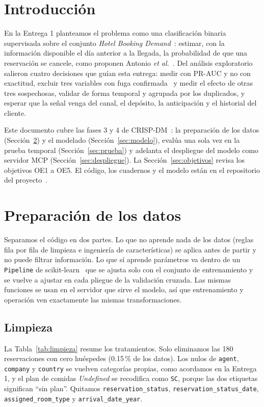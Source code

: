 \documentclass[conference]{IEEEtran}
\begin{document}
\section{Introducción}

En la Entrega 1 planteamos el problema como una clasificación binaria supervisada sobre el conjunto
\emph{Hotel Booking Demand}~\cite{antonio2019,tidytuesday}: estimar, con la información disponible
el día anterior a la llegada, la probabilidad de que una reservación se cancele, como proponen
Antonio \emph{et al.}~\cite{antonio2017}. Del análisis exploratorio salieron cuatro decisiones que guían esta entrega: medir con
PR-AUC y no con exactitud, excluir tres variables con fuga confirmada~\cite{kaufman} y medir el efecto de otras
tres sospechosas, validar de forma temporal y agrupada por los duplicados, y esperar que la señal
venga del canal, el depósito, la anticipación y el historial del cliente.

Este documento cubre las fases 3 y 4 de CRISP-DM~\cite{chapman}: la preparación de los datos (Sección~\ref{sec:prep}) y el modelado
(Sección~\ref{sec:modelo}), evalúa una sola vez en la prueba temporal
(Sección~\ref{sec:prueba}) y adelanta el despliegue del modelo como servidor MCP
(Sección~\ref{sec:despliegue}). La Sección~\ref{sec:objetivos} revisa los objetivos OE1 a OE5. El
código, los cuadernos y el modelo están en el repositorio del proyecto~\cite{repo}.

\section{Preparación de los datos}\label{sec:prep}

Separamos el código en dos partes. Lo que no aprende nada de los datos (reglas fila por fila de
limpieza e ingeniería de características) se aplica antes de partir y no puede filtrar
información. Lo que sí aprende parámetros va dentro de un \texttt{Pipeline} de
scikit-learn~\cite{pedregosa} que se ajusta solo con el conjunto de entrenamiento y se vuelve a
ajustar en cada pliegue de la validación cruzada. Las mismas funciones se usan en el servidor que
sirve el modelo, así que entrenamiento y operación ven exactamente las mismas transformaciones.

\subsection{Limpieza}

La Tabla~\ref{tab:limpieza} resume los tratamientos. Solo eliminamos las 180 reservaciones con
cero huéspedes (0.15\,\% de los datos). Los nulos de \texttt{agent}, \texttt{company} y
\texttt{country} se vuelven categorías propias, como acordamos en la Entrega 1, y el plan de
comidas \emph{Undefined} se recodifica como \texttt{SC}, porque las dos etiquetas significan
``sin plan''. Quitamos \texttt{reservation\_status}, \texttt{reservation\_status\_date},
\texttt{assigned\_room\_type} y \texttt{arrival\_date\_year}.
\end{document}
